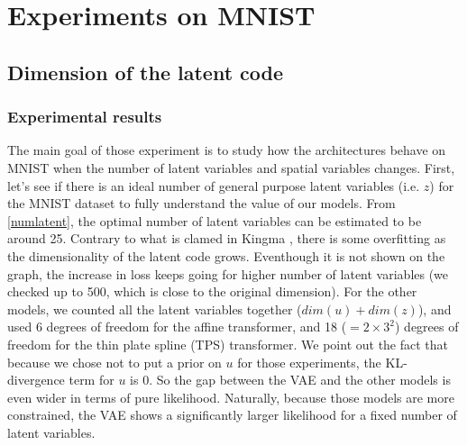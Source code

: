\documentclass[letterpaper, twoside]{article}
\begin{document}
\section{Experiments on MNIST}
\subsection{Dimension of the latent code}
\subsubsection{Experimental results}

The main goal of those experiment is to study how the architectures behave on MNIST when the number of latent variables and spatial variables changes. First, let's see if there is an ideal number of general purpose latent variables (i.e. $z$) for the MNIST dataset to fully understand the value of our models. From \ref{numlatent}, the optimal number of latent variables can be estimated to be around 25. Contrary to what is clamed in Kingma \cite{Kingma.aevb}, there is some overfitting as the dimensionality of the latent code grows. Eventhough it is not shown on the graph, the increase in loss keeps going for higher number of latent variables (we checked up to 500, which is close to the original dimension). For the other models, we counted all the latent variables together ($dim(u) + dim(z)$), and used 6 degrees of freedom for the affine transformer, and 18 ($=2\times 3^2$) degrees of freedom for the thin plate spline (TPS) transformer. We point out the fact that because we chose not to put a prior on $u$ for those experiments, the KL-divergence term for $u$ is 0. So the gap between the VAE and the other models is even wider in terms of pure likelihood. Naturally, because those models are more constrained, the VAE shows a significantly larger likelihood for a fixed number of latent variables.\\
\end{document}
